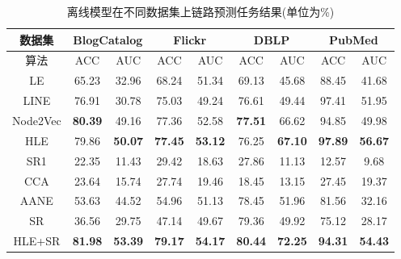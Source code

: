\begin{table}[]
	\centering
	\caption{离线模型在不同数据集上链路预测任务结果(单位为\%)}
	\label{tab:off_link_prediction}
	\begin{tabular}{|c||c|c||c|c||c|c||c|c|}
		\hline
		数据集      & \multicolumn{2}{c||}{BlogCatalog} & \multicolumn{2}{c||}{Flickr}     & \multicolumn{2}{c||}{DBLP}   & \multicolumn{2}{c|}{PubMed}     \\ \hline\hline
		算法       & ACC             & AUC            & ACC            & AUC            & ACC            & AUC            & ACC            & AUC            \\ \hline
		LE       & 65.23           & 32.96          & 68.24          & 51.34          & 69.13          & 45.68          & 88.45          & 41.68          \\ \hline
		LINE     & 76.91           & 30.78          & 75.03          & 49.24          & 76.61          & 49.44          & 97.41          & 51.95 \\ \hline
		Node2Vec & \textbf{80.39}  & 49.16          & 77.36          & 52.58          & \textbf{77.51} & 66.62          & 94.85          & 49.98          \\ \hline
		HLE      & 79.86           & \textbf{50.07} & \textbf{77.45} & \textbf{53.12} & 76.25          & \textbf{67.10} & \textbf{97.89} & \textbf{56.67}          \\ \hline\hline
		SR1      & 22.35           & 11.43          & 29.42          & 18.63          & 27.86          & 11.13          & 12.57          & 9.68           \\ \hline\hline
		CCA      & 23.64           & 15.74          & 27.74          & 19.46          & 18.45          & 13.15          & 27.45          & 19.37          \\ \hline
		AANE     & 53.63           & 44.52          & 54.96          & 51.13 & 78.45          & 51.96          & 81.56 & 32.16          \\ \hline
		SR       & 36.56           & 29.75          & 47.14          & 49.67          & 79.36          & 49.92          & 75.12          & 28.17          \\ \hline
		HLE+SR   & \textbf{81.98}  & \textbf{53.39} & \textbf{79.17} & \textbf{54.17}          & \textbf{80.44} & \textbf{72.25} & \textbf{94.31}          & \textbf{54.43} \\ \hline
	\end{tabular}
\end{table}

